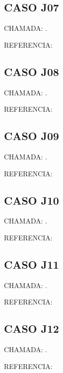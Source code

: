 \documentclass{undftex}
\begin{document}
\begin{refsection}\section*{CASO J07} CHAMADA: . \textcite{j07}\par REFERENCIA:\par\printbibliography[heading=none,check=undfconsultadas]\end{refsection}\clearpage
\begin{refsection}\section*{CASO J08} CHAMADA: . \textcite{j08}\par REFERENCIA:\par\printbibliography[heading=none,check=undfconsultadas]\end{refsection}\clearpage
\begin{refsection}\section*{CASO J09} CHAMADA: . \textcite{j09}\par REFERENCIA:\par\printbibliography[heading=none,check=undfconsultadas]\end{refsection}\clearpage
\begin{refsection}\section*{CASO J10} CHAMADA: . \textcite{j10}\par REFERENCIA:\par\printbibliography[heading=none,check=undfconsultadas]\end{refsection}\clearpage
\begin{refsection}\section*{CASO J11} CHAMADA: . \textcite{j11}\par REFERENCIA:\par\printbibliography[heading=none,check=undfconsultadas]\end{refsection}\clearpage
\begin{refsection}\section*{CASO J12} CHAMADA: . \textcite{j12}\par REFERENCIA:\par\printbibliography[heading=none,check=undfconsultadas]\end{refsection}\clearpage
\end{document}
